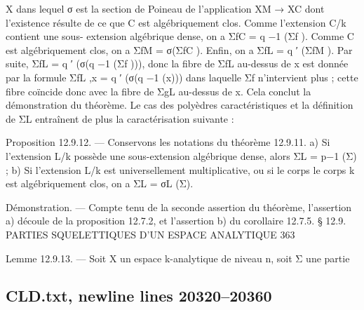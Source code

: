 \documentclass[
  10pt,
]{article}
\newenvironment{Shaded}{}{}
\newcommand{\NormalTok}[1]{#1}
\begin{document}
\begin{Shaded}
\begin{Highlighting}[]
\NormalTok{                                               X}
\NormalTok{dans lequel σ est la section de Poineau de l’application XM → XC dont l’existence}
\NormalTok{résulte de ce que C est algébriquement clos. Comme l’extension C/k contient une sous{-}}
\NormalTok{extension algébrique dense, on a ΣfC = q −1 (Σf ). Comme C est algébriquement clos, on}
\NormalTok{a ΣfM = σ(ΣfC ). Enfin, on a ΣfL = q ′ (ΣfM ). Par suite,}
\NormalTok{                                  ΣfL = q ′ (σ(q −1 (Σf ))),}
\NormalTok{donc la fibre de ΣfL au{-}dessus de x est donnée par la formule}
\NormalTok{                                   ΣfL ,x = q ′ (σ(q −1 (x)))}
\NormalTok{dans laquelle Σf n’intervient plus ; cette fibre coïncide donc avec la fibre de ΣgL au{-}dessus}
\NormalTok{de x. Cela conclut la démonstration du théorème.}
\NormalTok{  Le cas des polyèdres caractéristiques et la définition de ΣL entraînent de plus la}
\NormalTok{caractérisation suivante :}

\NormalTok{Proposition 12.9.12. — Conservons les notations du théorème 12.9.11.}
\NormalTok{   a) Si l’extension L/k possède une sous{-}extension algébrique dense, alors ΣL = p−1 (Σ) ;}
\NormalTok{   b) Si l’extension L/k est universellement multiplicative, ou si le corps le corps k est}
\NormalTok{algébriquement clos, on a ΣL = σL (Σ).}

\NormalTok{Démonstration. — Compte tenu de la seconde assertion du théorème, l’assertion a)}
\NormalTok{découle de la proposition 12.7.2, et l’assertion b) du corollaire 12.7.5.}
\NormalTok{                  § 12.9. PARTIES SQUELETTIQUES D’UN ESPACE ANALYTIQUE                         363}

\NormalTok{Lemme 12.9.13. — Soit X un espace k{-}analytique de niveau n, soit Σ une partie}
\end{Highlighting}
\end{Shaded}

\subsection{CLD.txt, newline lines
20320--20360}\label{cld.txt-newline-lines-2032020360}
\end{document}
